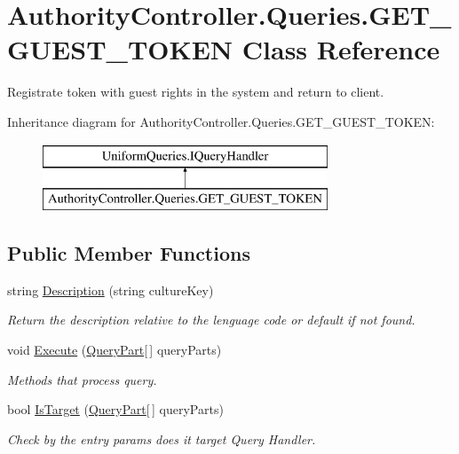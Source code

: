 \hypertarget{class_authority_controller_1_1_queries_1_1_g_e_t___g_u_e_s_t___t_o_k_e_n}{}\section{Authority\+Controller.\+Queries.\+G\+E\+T\+\_\+\+G\+U\+E\+S\+T\+\_\+\+T\+O\+K\+EN Class Reference}
\label{class_authority_controller_1_1_queries_1_1_g_e_t___g_u_e_s_t___t_o_k_e_n}


Registrate token with guest rights in the system and return to client.  


Inheritance diagram for Authority\+Controller.\+Queries.\+G\+E\+T\+\_\+\+G\+U\+E\+S\+T\+\_\+\+T\+O\+K\+EN\+:\begin{figure}[H]
\begin{center}
\leavevmode
\includegraphics[height=2.000000cm]{d0/db0/class_authority_controller_1_1_queries_1_1_g_e_t___g_u_e_s_t___t_o_k_e_n}
\end{center}
\end{figure}
\subsection*{Public Member Functions}
\begin{DoxyCompactItemize}
\item 
string \mbox{\hyperlink{class_authority_controller_1_1_queries_1_1_g_e_t___g_u_e_s_t___t_o_k_e_n_a72902cb3b94f31ec4f8e6cd0bb1f2ed8}{Description}} (string culture\+Key)
\begin{DoxyCompactList}\small\item\em Return the description relative to the lenguage code or default if not found. \end{DoxyCompactList}\item 
void \mbox{\hyperlink{class_authority_controller_1_1_queries_1_1_g_e_t___g_u_e_s_t___t_o_k_e_n_a99b0dddf4ff45771e546ec0fa14b0aae}{Execute}} (\mbox{\hyperlink{struct_uniform_queries_1_1_query_part}{Query\+Part}}\mbox{[}$\,$\mbox{]} query\+Parts)
\begin{DoxyCompactList}\small\item\em Methods that process query. \end{DoxyCompactList}\item 
bool \mbox{\hyperlink{class_authority_controller_1_1_queries_1_1_g_e_t___g_u_e_s_t___t_o_k_e_n_a5606c5797e0a684a6bfbbd851f186268}{Is\+Target}} (\mbox{\hyperlink{struct_uniform_queries_1_1_query_part}{Query\+Part}}\mbox{[}$\,$\mbox{]} query\+Parts)
\begin{DoxyCompactList}\small\item\em Check by the entry params does it target Query Handler. \end{DoxyCompactList}\end{DoxyCompactItemize}


